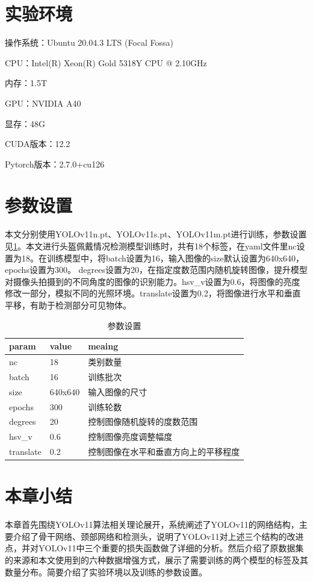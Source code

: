 \section{实验环境}
操作系统：Ubuntu 20.04.3 LTS (Focal Fossa)

CPU：Intel(R) Xeon(R) Gold 5318Y CPU @ 2.10GHz

内存：1.5T

GPU：NVIDIA A40

显存：48G

CUDA版本：12.2

Pytorch版本：2.7.0+cu126

\section{参数设置}
本文分别使用YOLOv11n.pt、YOLOv11s.pt、YOLOv11m.pt进行训练，参数设置见\ref{tab:param}。本文进行头盔佩戴情况检测模型训练时，共有18个标签，在yaml文件里nc设置为18。在训练模型中，将batch设置为16，输入图像的size默认设置为640x640，epochs设置为300。
degrees设置为20，在指定度数范围内随机旋转图像，提升模型对摄像头拍摄到的不同角度的图像的识别能力。hsv\_v设置为0.6，将图像的亮度修改一部分，模拟不同的光照环境。translate设置为0.2，将图像进行水平和垂直平移，有助于检测部分可见物体。

\begin{table}[H]
    \centering
    \caption[标签解释]{参数设置\label{tab:param}}
    \begin{tabular}{lll}
        \toprule
        \multicolumn{1}{l}{param} & \multicolumn{1}{l}{value} & \multicolumn{1}{l}{meaing}\\
        \midrule
        nc & 18 & 类别数量\\
        batch & 16 & 训练批次\\
        size & 640x640 & 输入图像的尺寸\\
        epochs & 300 & 训练轮数\\
        degrees & 20 & 控制图像随机旋转的度数范围\\
        hsv\_v & 0.6 & 控制图像亮度调整幅度\\
        translate & 0.2 & 控制图像在水平和垂直方向上的平移程度\\
        \bottomrule
    \end{tabular}
\end{table}

\section{本章小结}
本章首先围绕YOLOv11算法相关理论展开，系统阐述了YOLOv11的网络结构，主要介绍了骨干网络、颈部网络和检测头，说明了YOLOv11对上述三个结构的改进点，并对YOLOv11中三个重要的损失函数做了详细的分析。然后介绍了原数据集的来源和本文使用到的六种数据增强方式，展示了需要训练的两个模型的标签及其数量分布。简要介绍了实验环境以及训练的参数设置。